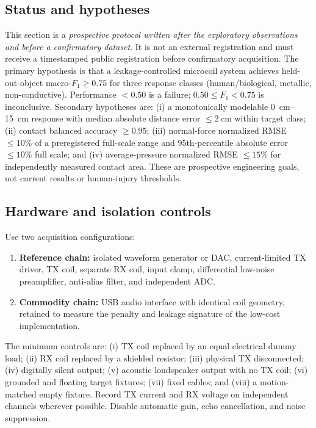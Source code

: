 \documentclass[10pt]{article}
\begin{document}
\subsection{Status and hypotheses}
This section is a \emph{prospective protocol written after the exploratory observations and before a confirmatory dataset}. It is not an external registration and must receive a timestamped public registration before confirmatory acquisition. The primary hypothesis is that a leakage-controlled microcoil system achieves held-out-object macro-$F_1\geq0.75$ for three response classes (human/biological, metallic, non-conductive). Performance $<0.50$ is a failure; $0.50\leq F_1<0.75$ is inconclusive. Secondary hypotheses are: (i) a monotonically modelable \SIrange{0}{15}{\centi\metre} response with median absolute distance error $\leq\SI{2}{\centi\metre}$ within target class; (ii) contact balanced accuracy $\geq0.95$; (iii) normal-force normalized RMSE $\leq10\%$ of a preregistered full-scale range and 95th-percentile absolute error $\leq10\%$ full scale; and (iv) average-pressure normalized RMSE $\leq15\%$ for independently measured contact area. These are prospective engineering goals, not current results or human-injury thresholds.

\subsection{Hardware and isolation controls}
Use two acquisition configurations:
\begin{enumerate}
\item \textbf{Reference chain:} isolated waveform generator or DAC, current-limited TX driver, TX coil, separate RX coil, input clamp, differential low-noise preamplifier, anti-alias filter, and independent ADC.
\item \textbf{Commodity chain:} USB audio interface with identical coil geometry, retained to measure the penalty and leakage signature of the low-cost implementation.
\end{enumerate}
The minimum controls are: (i) TX coil replaced by an equal electrical dummy load; (ii) RX coil replaced by a shielded resistor; (iii) physical TX disconnected; (iv) digitally silent output; (v) acoustic loudspeaker output with no TX coil; (vi) grounded and floating target fixtures; (vii) fixed cables; and (viii) a motion-matched empty fixture. Record TX current and RX voltage on independent channels wherever possible. Disable automatic gain, echo cancellation, and noise suppression.
\end{document}
